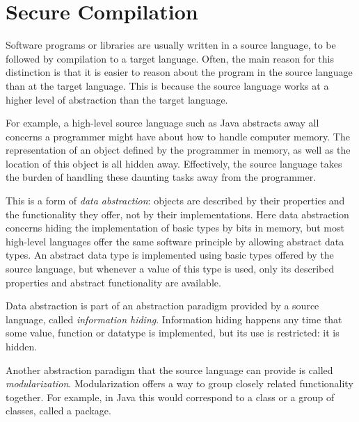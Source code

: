 
\section{Secure Compilation}
\label{sec:SecureCompilation}
Software programs or libraries are usually written in a source language, to be followed by compilation to a target language.
Often, the main reason for this distinction is that it is easier to reason about the program in the source language than at the target language.
This is because the source language works at a higher level of abstraction than the target language.

For example, a high-level source language such as Java abstracts away all concerns a programmer might have about how to handle computer memory.
The representation of an object defined by the programmer in memory, as well as the location of this object is all hidden away.
Effectively, the source language takes the burden of handling these daunting tasks away from the programmer.

This is a form of \emph{data abstraction}: objects are described by their properties and the functionality they offer, not by their implementations.
Here data abstraction concerns hiding the implementation of basic types by bits in memory, but most high-level languages offer the same software principle by allowing abstract data types. 
An abstract data type is implemented using basic types offered by the source language, but whenever a value of this type is used, only its described properties and abstract functionality are available.

Data abstraction is part of an abstraction paradigm provided by a source language, called \emph{information hiding}.
Information hiding happens any time that some value, function or datatype is implemented, but its use is restricted: it is hidden.

Another abstraction paradigm that the source language can provide is called \emph{modularization}.
Modularization offers a way to group closely related functionality together. For example, in Java this would correspond to a class or a group of classes, called a package.

